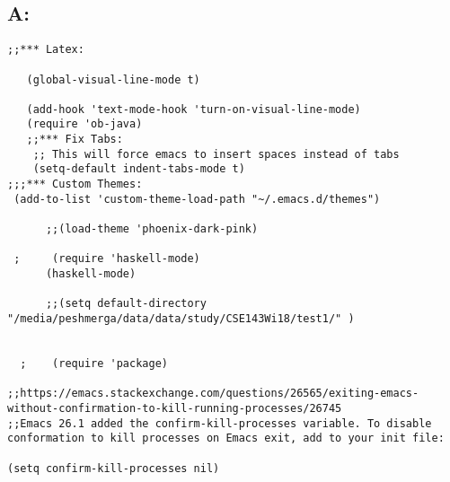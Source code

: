 \documentclass[11pt]{article}
\begin{document}
\subsection{A:}
\label{sec:orgaa881f1}
\begin{verbatim}
;;*** Latex:

   (global-visual-line-mode t)   

   (add-hook 'text-mode-hook 'turn-on-visual-line-mode)
   (require 'ob-java)
   ;;*** Fix Tabs:
    ;; This will force emacs to insert spaces instead of tabs
    (setq-default indent-tabs-mode t)
;;;*** Custom Themes:     
 (add-to-list 'custom-theme-load-path "~/.emacs.d/themes")

      ;;(load-theme 'phoenix-dark-pink)

 ;     (require 'haskell-mode)
      (haskell-mode)

      ;;(setq default-directory "/media/peshmerga/data/data/study/CSE143Wi18/test1/" )


  ;    (require 'package)

;;https://emacs.stackexchange.com/questions/26565/exiting-emacs-without-confirmation-to-kill-running-processes/26745
;;Emacs 26.1 added the confirm-kill-processes variable. To disable conformation to kill processes on Emacs exit, add to your init file:

(setq confirm-kill-processes nil)





\end{verbatim}
\end{document}
